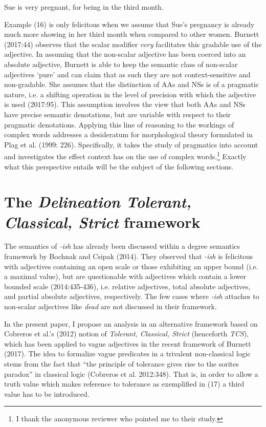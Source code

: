 \documentclass[output=paper
,modfonts
,nonflat]{langsci/langscibook}
\begin{document}
\begin{examples}
	\item Sue is very pregnant, for being in the third month.
\end{examples}

Example (16) is only felicitous when we assume that Sue's pregnancy is already much more showing in her third month when compared to other women. Burnett (2017:44) observes that the scalar modifier \textit{very} facilitates this gradable use of the adjective. In assuming that the non-scalar adjective has been coerced into an absolute adjective, Burnett is able to keep the semantic class of non-scalar adjectives `pure' and can claim that as such they are not context-sensitive and non-gradable. She assumes that the distinction of AAs and NSs is of a pragmatic nature, i.e. a shifting operation in the level of precision with which the adjective is used (2017:95). This assumption involves the view that both AAs and NSs have precise semantic denotations, but are variable with respect to their pragmatic denotations. Applying this line of reasoning to the workings of complex words addresses a desideratum for morphological theory formulated in Plag et al. (1999: 226). Specifically, it takes the study of pragmatics into account and investigates the effect context has on the use of complex words.\footnote{I thank the anonymous reviewer who pointed me to their study.} Exactly what this perspective entails will be the subject of the following sections.

\section{The \textit{Delineation Tolerant, Classical, Strict} framework}
\label{sec:deltcs} %

The semantics of \textit{-ish} has already been discussed within a degree semantics framework by Bochnak and Csipak (2014). They observed that \textit{-ish} is felicitous with adjectives containing an open scale or those exhibiting an upper bound (i.e. a maximal value), but are questionable with adjectives which contain a lower bounded scale (2014:435-436), i.e. relative adjectives, total absolute adjectives, and partial absolute adjectives, respectively. The few cases where \textit{-ish} attaches to non-scalar adjectives like \textit{dead} are not discussed in their framework.

In the present paper, I propose an analysis in an alternative framework based on Cobreros et al.'s (2012) notion of \textit{Tolerant, Classical, Strict} (henceforth \textit{TCS}), which has been applied to vague adjectives in the recent framework of Burnett (2017). The idea to formalize vague predicates in a trivalent non-classical logic stems from the fact that ``the principle of tolerance gives rise to the sorites paradox'' in classical logic (Cobreros et al. 2012:348). That is, in order to allow a truth value which makes reference to tolerance as exemplified in (17) a third value has to be introduced. %
\end{document}
